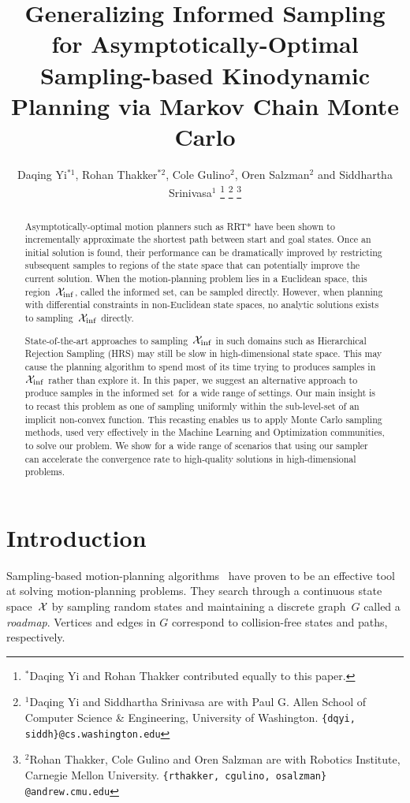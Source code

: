 \documentclass[letterpaper, 10 pt, conference]{ieeeconf}  %
\title{\LARGE \bf
Generalizing Informed Sampling
for Asymptotically-Optimal Sampling-based Kinodynamic Planning via Markov Chain
Monte Carlo
}
\author{
Daqing Yi$^{*1}$,
Rohan Thakker$^{*2}$,
Cole Gulino$^{2}$, 
Oren Salzman$^{2}$ and
Siddhartha Srinivasa$^{1}$
\thanks{$^{*}$Daqing Yi and Rohan Thakker contributed equally to this paper.}
\thanks{$^{1}$Daqing Yi and Siddhartha Srinivasa are with Paul G. Allen School of Computer Science \& Engineering, University of Washington.
{\tt\small \{dqyi, siddh\}@cs.washington.edu}}
\thanks{$^{2}$Rohan Thakker, Cole Gulino and Oren Salzman are with Robotics Institute, Carnegie Mellon University.
{\tt\small \{rthakker, cgulino, osalzman\} @andrew.cmu.edu}}%
}
\begin{document}
\maketitle
\thispagestyle{empty}
\pagestyle{empty}


\begin{abstract}
Asymptotically-optimal motion planners such as RRT* have been shown to incrementally approximate the shortest path between start and goal states.
Once an initial solution is found, their performance can be dramatically improved by restricting subsequent samples to regions of the state space that can potentially improve the current solution.
When the motion-planning problem lies in a Euclidean space, this region~$\mathcal{X}_{\rm {inf}}$, called the informed set, can be sampled directly.
However, when planning with differential constraints in non-Euclidean state spaces, no analytic solutions exists to sampling~$\mathcal{X}_{\rm {inf}}$ directly.

State-of-the-art approaches to sampling~$\mathcal{X}_{\rm {inf}}$ in such domains such as Hierarchical Rejection Sampling (HRS) may still be slow in high-dimensional state space.
This may cause the planning algorithm to spend most of its time trying to produces samples in~$\mathcal{X}_{\rm {inf}}$ rather than explore it.
In this paper, we suggest an alternative approach to produce samples in the informed set~\Cinf for a wide range of settings.
Our main insight is to recast this problem as one of sampling uniformly within the sub-level-set of an implicit non-convex function.
This recasting enables us to apply Monte Carlo sampling methods, used very effectively in the Machine Learning and Optimization communities, to solve our problem.
We show for a wide range of scenarios that using our sampler can accelerate the convergence rate to high-quality solutions in high-dimensional problems.
\end{abstract}


\section{Introduction}
\label{sec:intro}


Sampling-based motion-planning algorithms~\cite{L06} have proven to be an effective tool at solving motion-planning problems.
They search through a continuous state space~$\mathcal{X}$ by sampling random states and maintaining a discrete graph~$G$ called a \emph{roadmap}.
Vertices and edges in $G$ correspond to collision-free states and paths, respectively.
\end{document}
